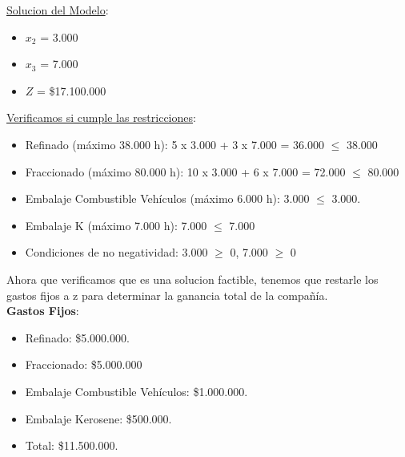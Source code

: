 \documentclass[10pt,a4paper]{article}
\begin{document}
\begin{enumerate}
\begin{itemize}
    \end{itemize}

    \underline{Solucion del Modelo}: 

    \begin{itemize}

        \item $x_{2}$ = 3.000
        \item $x_{3}$ = 7.000
        \item $Z$ = \$17.100.000\\

    \end{itemize}

    \underline{Verificamos si cumple las restricciones}:

    \begin{itemize}

        \item Refinado (máximo 38.000 h):  5 x 3.000 + 3 x 7.000 = 36.000 $\leq$ 38.000
        \item Fraccionado (máximo 80.000 h): 10 x 3.000 + 6 x 7.000 = 72.000 $\leq$ 80.000
        \item Embalaje Combustible Vehículos (máximo 6.000 h): 3.000 $\leq$ 3.000.
        \item Embalaje K (máximo 7.000 h): 7.000 $\leq$ 7.000
        \item Condiciones de no negatividad: 3.000  $\geq$ 0, 7.000 $\geq$ 0\\

    \end{itemize}

    Ahora que verificamos que es una solucion factible, tenemos que restarle los gastos fijos a z para determinar la ganancia total de la compañía.\\

    \textbf{Gastos Fijos}:

    \begin{itemize}

        \item Refinado: \$5.000.000.
        \item Fraccionado: \$5.000.000
        \item Embalaje Combustible Vehículos: \$1.000.000.
        \item Embalaje Kerosene: \$500.000.
        \item Total: \$11.500.000.

    \end{itemize}


\end{enumerate}
\end{document}
